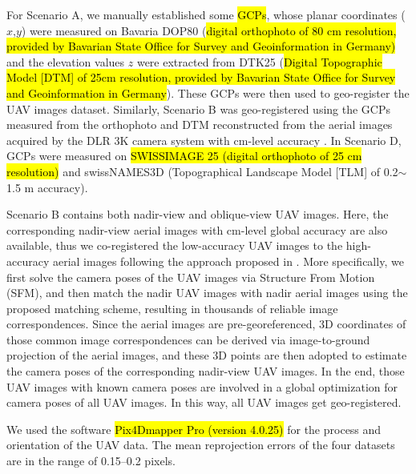 For Scenario A, we manually established some \hl{GCPs}, whose planar coordinates ($x$,$y$) were measured on Bavaria DOP80 (\hl{digital orthophoto of 80 cm resolution, provided by Bavarian State Office for Survey and Geoinformation in Germany)} and the elevation values $z$ were extracted from DTK25 (\hl{Digital Topographic Model [DTM] of 25cm resolution, provided by Bavarian State Office for Survey and Geoinformation in Germany}). 
These GCPs were then used to geo-register the UAV images dataset. Similarly, Scenario B was geo-registered using the GCPs measured from the orthophoto and DTM \cite{d2011semiglobal} reconstructed from the aerial images acquired by the DLR 3K camera system with cm-level accuracy \cite{kurz2014performance}. In Scenario D, GCPs were measured on \hl{SWISSIMAGE 25 (digital orthophoto of 25 cm resolution)} and swissNAMES3D (Topographical Landscape Model [TLM] of 0.2$\sim$1.5 m accuracy).

Scenario B contains both nadir-view and oblique-view UAV images. Here, the corresponding nadir-view aerial images with cm-level global accuracy are also available, thus we co-registered the low-accuracy UAV images to the high-accuracy aerial images following the approach proposed in \cite{zhuo2017automatic}. More specifically, we first solve the camera poses of the UAV images via Structure From Motion (SFM), and then match the nadir UAV images with nadir aerial images using the proposed matching scheme, resulting in thousands of reliable image correspondences. Since the aerial images are pre-georeferenced, 3D coordinates of those common image correspondences can be derived via image-to-ground projection of the aerial images, and these 3D points are then adopted to estimate the camera poses of the corresponding nadir-view UAV images. In the end, those UAV images with known camera poses are involved in a global optimization for camera poses of all UAV images. In this way, all UAV images get geo-registered.

We used the software \hl{Pix4Dmapper Pro (version 4.0.25)} for the process and orientation of the UAV data. The mean reprojection errors of the four datasets are in the range of 0.15--0.2 pixels.

           

